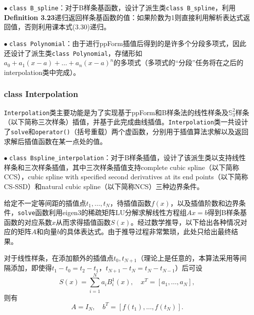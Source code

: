 \documentclass{ctexart}
\begin{document}
\begin{sloppypar}
$\bullet \;$\verb|class B_spline|：对于B样条基函数，设计了派生类\verb|class B_spline|，利用\textbf{Definition 3.23}递归返回样条基函数的值：如果阶数为1则直接利用解析表达式返回值，否则利用课本式(3.30)递归。

$\bullet \;$\verb|class Polynomial|：由于进行ppForm插值后得到的是许多个分段多项式，因此还设计了派生类\verb|class Polynomial|，存储形如$a_0+a_1(x-a)+\dots+a_n(x-a)^n$的多项式（多项式的“分段”任务将在之后的interpolation类中完成）。
\subsubsection{class Interpolation}
\verb|Interpolation|类主要功能是为了实现基于ppForm和B样条法的线性样条及$\mathbb{S}^2_3$样条（以下简称三次样条）插值，并基于此完成曲线插值。\verb|Interpolation|类一共设计了\verb|solve|和\verb|operator()|（括号重载）两个虚函数，分别用于插值算法求解以及返回求解后插值函数在某一点处的值。

$\bullet \;$\verb|class Bspline_interpolation|：对于B样条插值，设计了该派生类以支持线性样条和三次样条插值，其中三次样条插值支持complete cubic spline（以下简称CCS），cubic spline with specified second derivatives at its end points（以下简称CS-SSD）和natural cubic spline（以下简称NCS）三种边界条件。

给定不一定等间距的插值点$t_1,\dots,t_N$，待插值函数$f(x)$，以及插值阶数和边界条件，\verb|solve|函数利用eigen3的稀疏矩阵LU分解求解线性方程组$Ax = b$得到B样条基函数的对应系数$x$从而求得插值函数$S(x)$。经过数学推导，以下给出各种情况对应的矩阵$A$和向量$b$的具体表达式。由于推导过程非常繁琐，此处只给出最终结果。

对于线性样条，在添加额外的插值点$t_0,t_{N+1}$（理论上是任意的，本算法采用等间隔添加，即使得$t_1-t_0=t_2-t_1$，$t_{N+1}-t_{N} = t_{N}-t_{N-1}$）后可设
\begin{equation}
    S(x) = \sum^N_{i=1}a_iB^1_i(x),\quad x^T = [a_1,\dots,a_N],
\end{equation}
则有
\begin{equation}
    A = I_N,\quad b^T = [f(t_1),\dots,f(t_N)].
\end{equation}


\end{sloppypar}
\end{document}
